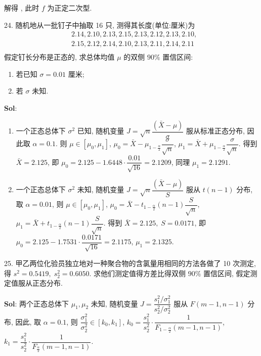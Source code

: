 解得 , 此时 $f$ 为正定二次型.


\vspace{12pt}

24. 随机地从一批钉子中抽取 16 只, 测得其长度(单位:厘米)为
$$
\begin{aligned}
&2.14,2.10,2.13,2.15,2.13,2.12,2.13,2.10,\\
&2.15,2.12,2.14,2.10,2.13,2.11,2.14,2.11\\
\end{aligned}
$$
假定钉长分布是正态的, 求总体均值 $\mu$ 的双侧 $90\%$ 置信区间:
\begin{enumerate}[(1)]
    \item 若已知 $\sigma=0.01$ 厘米;
    \item 若 $\sigma$ 未知.
\end{enumerate}

\textbf{Sol}: 

\begin{enumerate}[(1)]
    \item 一个正态总体下 $\sigma^2$ 已知, 
    随机变量 $J=\sqrt{n}\dfrac{(\bar{X}-\mu)}{\sigma}$ 服从标准正态分布, 
    因此取 $\alpha=0.1$. 则 $\mu\in[\mu_0,\mu_1]$, 
    $\mu_0=\bar{X}-\mu_{1-\frac{\alpha}{2}}\dfrac{\sigma}{\sqrt{n}}$, 
    $\mu_1=\bar{X}+\mu_{1-\frac{\alpha}{2}}\dfrac{\sigma}{\sqrt{n}}$. 得到 $\bar{X}=2.125$, 即 $\mu_0=2.125-1.6448\cdot\dfrac{0.01}{\sqrt{16}}=2.1209$, 同理 $\mu_1=2.1291$. 
    \mymathbox{[2.1209,2.1291]}
    \item 一个正态总体下 $\sigma^2$ 未知, 随机变量 $J=\sqrt{n}\dfrac{(\bar{X}-\mu)}{S}$ 服从 $t(n-1)$ 分布, 取 $\alpha=0.01$, 则 $\mu\in[\mu_0,\mu_1]$, $\mu_0=\bar{X}-t_{1-\frac{\alpha}{2}}(n-1)\dfrac{S}{\sqrt{n}}$, $\mu_1=\bar{X}+t_{1-\frac{\alpha}{2}}(n-1)\dfrac{S}{\sqrt{n}}$. 得到 $\bar{X}=2.125,\;S=0.0171$, 即 $\mu_0=2.125-1.7531\cdot\dfrac{0.0171}{\sqrt{16}}=2.1175$, $\mu_1=2.1325$. 
    \mymathbox{[2.1175,2.1325]}
\end{enumerate}


\vspace{12pt}

25. 甲乙两位化验员独立地对一种聚合物的含氯量用相同的方法各做了 10 次测定, 得 $s^2=0.5419,\;s_2^2=0.6050$. 求他们测定值得方差比得双侧 $90\%$ 置信区间, 假定测定值服从正态分布.

\textbf{Sol}: 两个正态总体下 $\mu_1,\mu_2$ 未知, 随机变量 $J=\dfrac{s_1^2/\sigma_1^2}{s_2^2/\sigma_2^2}$ 服从 $F(m-1,n-1)$ 分布, 因此, 取 $\alpha=0.1$, 则 $\dfrac{\sigma_1^2}{\sigma_2^2}\in[k_0,k_1]$, $k_0=\dfrac{s_1^2}{s_2^2}\cdot\dfrac{1}{F_{1-\frac{\alpha}{2}}(m-1,n-1)}$, $k_1=\dfrac{s_1^2}{s_2^2}\cdot\dfrac{1}{F_{\frac{\alpha}{2}}(m-1,n-1)}$.

